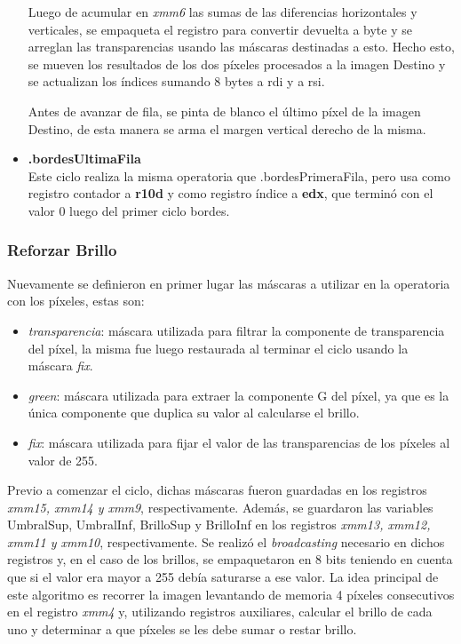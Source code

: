 \documentclass[a4paper]{article}
\begin{document}
\begin{itemize}
	Luego de acumular en \textit{xmm6} las sumas de las diferencias horizontales y verticales, se empaqueta el registro para convertir devuelta a byte y se arreglan las transparencias usando las máscaras destinadas a esto. Hecho esto, se mueven los resultados de los dos píxeles procesados a la imagen Destino y se actualizan los índices sumando 8 bytes a rdi y a rsi.
	
	Antes de avanzar de fila, se pinta de blanco el último píxel de la imagen Destino, de esta manera se arma el margen vertical derecho de la misma.
	\item \textbf{.bordesUltimaFila}\\
	Este ciclo realiza la misma operatoria que .bordesPrimeraFila, pero usa como registro contador a \textbf{r10d} y como registro índice a \textbf{edx}, que terminó con el valor 0 luego del primer ciclo bordes.
\end{itemize}
	
   
\subsubsection{Reforzar Brillo}

\justify
Nuevamente se definieron en primer lugar las máscaras a utilizar en la operatoria con los píxeles, estas son:
\begin{itemize}
	\item \textit{transparencia}: máscara utilizada para filtrar la componente de transparencia del píxel, la misma fue luego restaurada al terminar el ciclo usando la máscara \textit{fix}.
	\item \textit{green}: máscara utilizada para extraer la componente G del píxel, ya que es la única componente que duplica su valor al calcularse el brillo.
	\item \textit{fix}: máscara utilizada para fijar el valor de las transparencias de los píxeles al valor de 255.
\end{itemize} 
\justify
Previo a comenzar el ciclo, dichas máscaras fueron guardadas en los registros \textit{xmm15, xmm14 y xmm9}, respectivamente. Además, se guardaron las variables UmbralSup, UmbralInf, BrilloSup y BrilloInf en los registros \textit{xmm13, xmm12, xmm11 y xmm10}, respectivamente. Se realizó el \textit{broadcasting} necesario en dichos registros y, en el caso de los brillos, se empaquetaron en 8 bits teniendo en cuenta que si el valor era mayor a 255 debía saturarse a ese valor.
\justify
La idea principal de este algoritmo es recorrer la imagen levantando de memoria 4 píxeles consecutivos en el registro \textit{xmm4} y, utilizando registros auxiliares, calcular el brillo de cada uno y determinar a que píxeles se les debe sumar o restar brillo.
\end{document}
